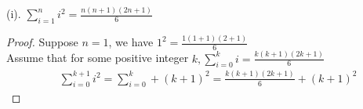 \documentclass[11pt]{amsart}
\begin{document}
(i). $\sum_{i=1}^{n} i^2 = \frac{n(n+1)(2n+1)}{6}$

\begin{proof}
	Suppose $n=1$, we have $1^2 = \frac{1(1+1)(2+1)}{6}$ \\

	Assume that for some positive integer $k, \sum_{i=0}^{k} i = \frac{k(k+1)(2k+1)}{6}$ \\

	\begin{align*}
		&\sum_{i=0}^{k+1} i^2 = \sum_{i=0}^{k} + (k+1)^2 = \frac{k(k+1)(2k+1)}{6} + (k+1)^2 
	\end{align*}
\end{proof}
\end{document}
